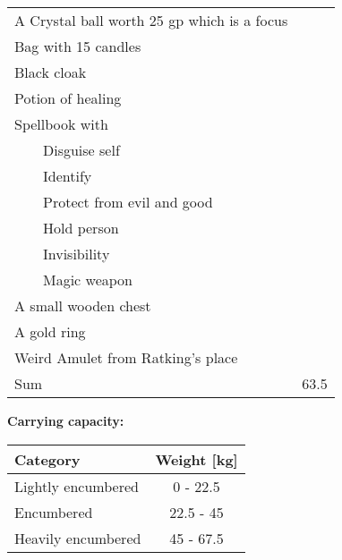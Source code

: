 \documentclass[11pt]{article}
\newcommand{\tabitem}{~~\llap{--}~~}
\begin{document}
	\begin{tabularx}{\textwidth}{X|r}
A Crystal ball worth 25 gp which is a focus & \hspace{19mm} \\
Bag with 15 candles							&		\\
Black cloak									&		\\
Potion of healing							&		\\
Spellbook with								&		\\
\tabitem Disguise self						&		\\
\tabitem Identify							&       \\
\tabitem Protect from evil and good			&		\\
\tabitem Hold person						&		\\
\tabitem Invisibility						&		\\
\tabitem Magic weapon						&		\\
A small wooden chest						&		\\
A gold ring									&		\\
Weird Amulet from Ratking's place			&		\\
\hline
Sum 										& 63.5
	\end{tabularx}

\vspace{15mm}

\textbf{Carrying capacity:} \\

	\begin{tabular}{l|c}
Category & Weight [kg] \\
\hline
Lightly encumbered 	& 0 - 22.5 	\\
Encumbered 			& 22.5 - 45 \\
Heavily encumbered	& 45 - 67.5
	\end{tabular}
\end{document}
